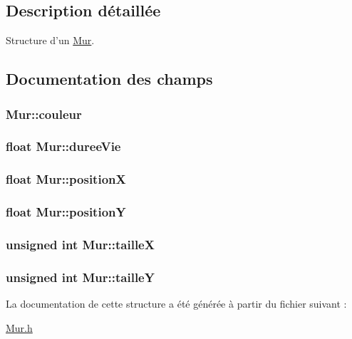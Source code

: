 \subsection{Description détaillée}
Structure d'un \hyperlink{structMur}{Mur}. 

\subsection{Documentation des champs}
\hypertarget{structMur_adfb47de65971e21c8b3012cfcf7cab28}{
\subsubsection[{couleur}]{ Mur\-::couleur}}\label{structMur_adfb47de65971e21c8b3012cfcf7cab28}
\hypertarget{structMur_a7b0f44b48d4a8408e1adeb057ad201f8}{
\subsubsection[{duree\-Vie}]{\setlength{\rightskip}{0pt plus 5cm}float Mur\-::duree\-Vie}}\label{structMur_a7b0f44b48d4a8408e1adeb057ad201f8}
\hypertarget{structMur_affc832d25c091c05a2ab0340a38e8617}{
\subsubsection[{position\-X}]{\setlength{\rightskip}{0pt plus 5cm}float Mur\-::position\-X}}\label{structMur_affc832d25c091c05a2ab0340a38e8617}
\hypertarget{structMur_a5cb3e3d2e2f71120f6746772a44a0980}{
\subsubsection[{position\-Y}]{\setlength{\rightskip}{0pt plus 5cm}float Mur\-::position\-Y}}\label{structMur_a5cb3e3d2e2f71120f6746772a44a0980}
\hypertarget{structMur_a83d5a0639f49e58cfb805a91702d6701}{
\subsubsection[{taille\-X}]{\setlength{\rightskip}{0pt plus 5cm}unsigned int Mur\-::taille\-X}}\label{structMur_a83d5a0639f49e58cfb805a91702d6701}
\hypertarget{structMur_ad0c6b841ae4069d6b4e6559d7e88cf47}{
\subsubsection[{taille\-Y}]{\setlength{\rightskip}{0pt plus 5cm}unsigned int Mur\-::taille\-Y}}\label{structMur_ad0c6b841ae4069d6b4e6559d7e88cf47}


La documentation de cette structure a été générée à partir du fichier suivant \-:\begin{DoxyCompactItemize}
\item 
\hyperlink{Mur_8h}{Mur.\-h}\end{DoxyCompactItemize}
